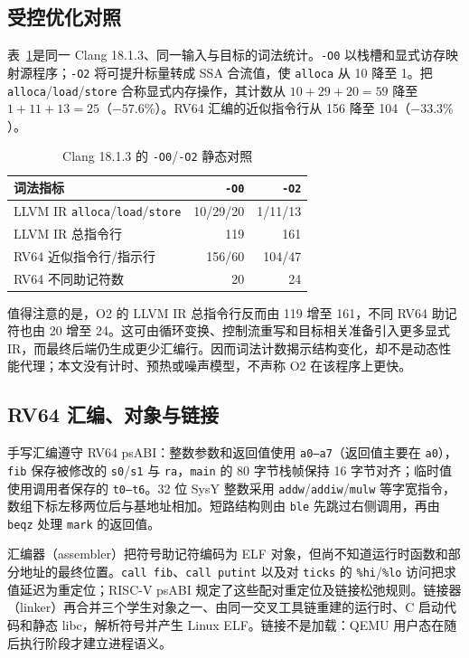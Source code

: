\subsection{受控优化对照}

表~\ref{tab:optimization}是同一 Clang 18.1.3、同一输入与目标的词法统计。\texttt{-O0} 以栈槽和显式访存映射源程序；\texttt{-O2} 将可提升标量转成 SSA 合流值，使 \texttt{alloca} 从 10 降至 1。把 \texttt{alloca}/\texttt{load}/\texttt{store} 合称显式内存操作，其计数从 $10+29+20=59$ 降至 $1+11+13=25$（$-57.6\%$）。RV64 汇编的近似指令行从 156 降至 104（$-33.3\%$）。

\begin{table}
\caption{Clang 18.1.3 的 \texttt{-O0}/\texttt{-O2} 静态对照}
\label{tab:optimization}
\centering
\begin{tabular}{lrr}
\toprule
词法指标 & \texttt{-O0} & \texttt{-O2} \\
\midrule
LLVM IR \texttt{alloca}/\texttt{load}/\texttt{store} & 10/29/20 & 1/11/13 \\
LLVM IR 总指令行 & 119 & 161 \\
RV64 近似指令行/指示行 & 156/60 & 104/47 \\
RV64 不同助记符数 & 20 & 24 \\
\bottomrule
\end{tabular}
\end{table}

值得注意的是，O2 的 LLVM IR 总指令行反而由 119 增至 161，不同 RV64 助记符也由 20 增至 24。这可由循环变换、控制流重写和目标相关准备引入更多显式 IR，而最终后端仍生成更少汇编行。因而词法计数揭示结构变化，却不是动态性能代理；本文没有计时、预热或噪声模型，不声称 O2 在该程序上更快。

\subsection{RV64 汇编、对象与链接}

手写汇编遵守 RV64 psABI：整数参数和返回值使用 \texttt{a0--a7}（返回值主要在 \texttt{a0}），\texttt{fib} 保存被修改的 \texttt{s0}/\texttt{s1} 与 \texttt{ra}，\texttt{main} 的 80 字节栈帧保持 16 字节对齐；临时值使用调用者保存的 \texttt{t0--t6}\cite{riscvPsabi}。32 位 SysY 整数采用 \texttt{addw}/\texttt{addiw}/\texttt{mulw} 等字宽指令，数组下标左移两位后与基地址相加。短路结构则由 \texttt{ble} 先跳过右侧调用，再由 \texttt{beqz} 处理 \texttt{mark} 的返回值。

汇编器（assembler）把符号助记符编码为 ELF 对象，但尚不知道运行时函数和部分地址的最终位置。\texttt{call fib}、\texttt{call putint} 以及对 \texttt{ticks} 的 \texttt{\%hi}/\texttt{\%lo} 访问把求值延迟为重定位；RISC-V psABI 规定了这些配对重定位及链接松弛规则\cite{riscvPsabi,riscvAsm}。链接器（linker）再合并三个学生对象之一、由同一交叉工具链重建的运行时、C 启动代码和静态 libc，解析符号并产生 Linux ELF。链接不是加载：QEMU 用户态在随后执行阶段才建立进程语义。

